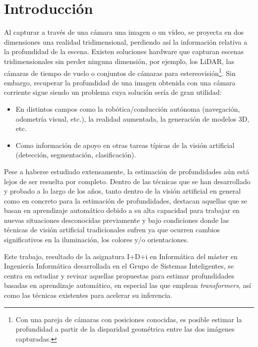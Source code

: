 \documentclass[a4paper]{article}
\begin{document}
\section{Introducción}
Al capturar a través de una cámara una imagen o un vídeo, se proyecta en dos dimensiones una realidad tridimensional, perdiendo así la información relativa a la profundidad de la escena. Existen soluciones hardware que capturan escenas tridimensionales sin perder ninguna dimensión, por ejemplo, los LiDAR, las cámaras de tiempo de vuelo o conjuntos de cámaras para estereovisión\footnote{Con una pareja de cámaras con posiciones conocidas, es posible estimar la profundidad a partir de la disparidad geométrica entre las dos imágenes capturadas.}. Sin embargo, recuperar la profundidad de una imagen obtenida con una cámara corriente sigue siendo un problema cuya solución sería de gran utilidad:
\begin{itemize}
    \item En distintos campos como la robótica/conducción autónoma (navegación, odometría visual, etc.), la realidad aumentada, la generación de modelos 3D, etc.
    \item Como información de apoyo en otras tareas típicas de la visión artificial (detección, segmentación, clasificación).
\end{itemize}

Pese a haberse estudiado extensamente, la estimación de profundidades aún está lejos de ser resuelta por completo. Dentro de las técnicas que se han desarrollado y probado a lo largo de los años, tanto dentro de la visión artificial en general como en concreto para la estimación de profundidades, destacan aquellas que se basan en aprendizaje automático debido a su alta capacidad para trabajar en nuevas situaciones desconocidas previamente y bajo condiciones donde las técnicas de visión artificial tradicionales sufren ya que ocurren cambios significativos en la iluminación, los colores y/o orientaciones. 

Este trabajo, resultado de la asignatura I+D+i en Informática del máster en Ingeniería Informática desarrollada en el Grupo de Sistemas Inteligentes, se centra en estudiar y revisar aquellas propuestas para estimar profundidades basadas en aprendizaje automático, en especial las que emplean \textit{transformers}, así como las técnicas existentes para acelerar su inferencia.
\end{document}

